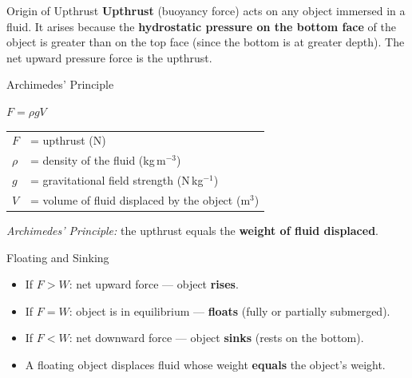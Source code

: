 \begin{definitionbox}{Origin of Upthrust}
\textbf{Upthrust} (buoyancy force) acts on any object immersed in a fluid. It arises because the \textbf{hydrostatic pressure on the bottom face} of the object is greater than on the top face (since the bottom is at greater depth). The net upward pressure force is the upthrust.
\end{definitionbox}

\begin{formulabox}{Archimedes' Principle}
\begin{center}
\Large $F = \rho g V$
\end{center}
\vspace{0.3em}
\begin{tabular}{@{}ll@{}}
$F$   & = upthrust (N) \\
$\rho$& = density of the fluid (kg\,m$^{-3}$) \\
$g$   & = gravitational field strength (N\,kg$^{-1}$) \\
$V$   & = volume of fluid displaced by the object (m$^3$) \\
\end{tabular}

\vspace{0.5em}
\textit{Archimedes' Principle:} the upthrust equals the \textbf{weight of fluid displaced}.
\end{formulabox}

\begin{center}
\end{center}

\begin{keybox}{Floating and Sinking}
\begin{itemize}[itemsep=2pt]
  \item If $F > W$: net upward force — object \textbf{rises}.
  \item If $F = W$: object is in equilibrium — \textbf{floats} (fully or partially submerged).
  \item If $F < W$: net downward force — object \textbf{sinks} (rests on the bottom).
  \item A floating object displaces fluid whose weight \textbf{equals} the object's weight.
\end{itemize}
\end{keybox}


